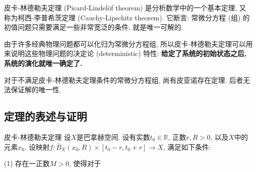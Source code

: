 
皮卡-林德勒夫定理 (Picard-Lindelöf theorem) 是分析数学中的一个基本定理, 又称为柯西-李普希茨定理 (Cauchy-Lipschitz theorem). 它断言: 常微分方程 (组) 的初值问题只需要满足一些非常宽泛的条件, 就是唯一可解的. 

由于许多经典物理问题都可以化归为常微分方程组, 所以皮卡-林德勒夫定理可以用来说明这些物理问题的决定论 (deterministic) 特性: \textbf{给定了系统的初始状态之后, 系统的演化就唯一确定了.}

对于不满足皮卡-林德勒夫定理条件的常微分方程组, 尚有皮亚诺存在定理. 后者无法保证解的唯一性.

\subsection{定理的表述与证明}
\begin{theorem}{皮卡-林德勒夫定理}
设$X$是巴拿赫空间. 设有实数$t_0\in\mathbb{R}$, 正数$r,R>0$, 以及$X$中的元素$x_0$. 设映射$f:\bar B_X(x_0,R)\times[t_0-r,t_0+r]\to X$, 满足如下条件:

(1) 存在一正数$M>0$, 使得对于$$
\end{theorem}